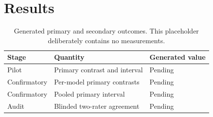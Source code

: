 \section{Results}


\begin{table}[ht]
\centering
\caption{Generated primary and secondary outcomes. This placeholder deliberately contains no measurements.}
\label{tab:results}
\begin{tabular}{lll}
\toprule
Stage & Quantity & Generated value \\
\midrule
Pilot & Primary contrast and interval & Pending \\
Confirmatory & Per-model primary contrasts & Pending \\
Confirmatory & Pooled primary interval & Pending \\
Audit & Blinded two-rater agreement & Pending \\
\bottomrule
\end{tabular}
\end{table}
